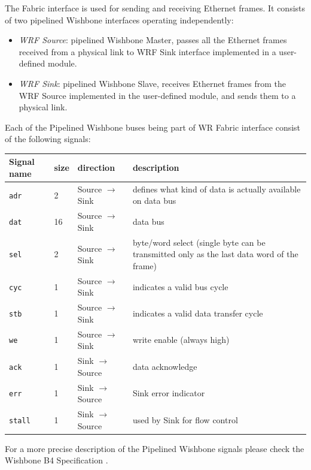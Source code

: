 The Fabric interface is used for sending and receiving Ethernet frames. It consists 
of two pipelined Wishbone interfaces operating independently: 
\begin{itemize}
  \item \emph{WRF Source}: pipelined Wishbone Master, passes all the Ethernet frames
    received from a physical link to WRF Sink interface implemented in a
    user-defined module.
  \item \emph{WRF Sink}: pipelined Wishbone Slave, receives Ethernet frames from
    the WRF Source implemented in the user-defined module, and sends them to a
    physical link.
\end{itemize}
Each of the Pipelined Wishbone buses being part of WR Fabric interface consist
of the following signals:
\begin{center}
  \begin{tabular}{|l|l|l|p{10cm}|}
    \hline
    {\bf Signal name} & {\bf size} & {\bf direction} & {\bf description} \\
    \hline
    \hline \texttt{adr} & 2 & Source $\rightarrow$ Sink & defines what kind of data is actually available on data bus\\
    \hline \texttt{dat} & 16 & Source $\rightarrow$ Sink & data bus \\
    \hline \texttt{sel} & 2 & Source $\rightarrow$ Sink & byte/word select (single
    byte can be transmitted only as the last data word of the frame)\\
    \hline \texttt{cyc} & 1 & Source $\rightarrow$ Sink &  indicates a valid bus cycle\\
    \hline \texttt{stb} & 1 & Source $\rightarrow$ Sink &  indicates a valid data
    transfer cycle\\
    \hline \texttt{we}  & 1 & Source $\rightarrow$ Sink & write enable (always high)\\
    \hline \texttt{ack} & 1 & Sink $\rightarrow$ Source & data acknowledge\\
    \hline \texttt{err} & 1 & Sink $\rightarrow$ Source & Sink error indicator\\
    \hline \texttt{stall} & 1 & Sink $\rightarrow$ Source & used by Sink for flow control\\
    \hline
  \end{tabular}
\end{center}

For a more precise description of the Pipelined Wishbone signals please check the
Wishbone B4 Specification \cite{wb_spec}.\\

